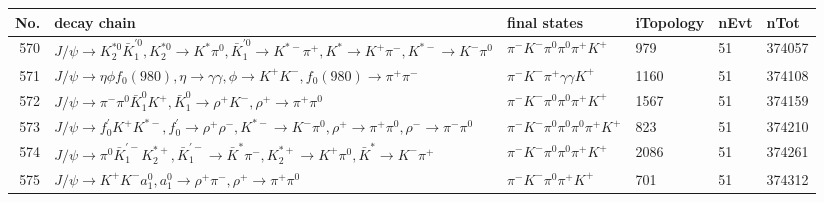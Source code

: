 \begin{table}[htbp] 
\begin{center}
\begin{small}
\begin{tabular}{rlllll}\hline\hline
 No. & decay chain & final states &  iTopology & nEvt & nTot \\\hline
570&$J/\psi       \rightarrow K_2^{*0}       \bar{K}_1^{'0}, K_2^{*0}        \rightarrow K^{*}          \pi^{0}        , \bar{K}_1^{'0} \rightarrow K^{*-}         \pi^{+}        , K^{*}           \rightarrow K^{+}          \pi^{-}        , K^{*-}          \rightarrow K^{-}          \pi^{0}        $&$\pi^{-}        K^{-}          \pi^{0}        \pi^{0}        \pi^{+}        K^{+}          $&  979&   51&374057\\
571&$J/\psi       \rightarrow \eta          \phi           f_{0}(980)     , \eta           \rightarrow \gamma       \gamma       , \phi            \rightarrow K^{+}          K^{-}          , f_{0}(980)      \rightarrow \pi^{+}        \pi^{-}        $&$\pi^{-}        K^{-}          \pi^{+}        \gamma       \gamma       K^{+}          $& 1160&   51&374108\\
572&$J/\psi       \rightarrow \pi^{-}        \pi^{0}        \bar{K}_1^{0} K^{+}          , \bar{K}_1^{0}  \rightarrow \rho^{+}      K^{-}          , \rho^{+}       \rightarrow \pi^{+}        \pi^{0}        $&$\pi^{-}        K^{-}          \pi^{0}        \pi^{0}        \pi^{+}        K^{+}          $& 1567&   51&374159\\
573&$J/\psi       \rightarrow f^{'}_{0}     K^{+}          K^{*-}         , f^{'}_{0}      \rightarrow \rho^{+}      \rho^{-}      , K^{*-}          \rightarrow K^{-}          \pi^{0}        , \rho^{+}       \rightarrow \pi^{+}        \pi^{0}        , \rho^{-}       \rightarrow \pi^{-}        \pi^{0}        $&$\pi^{-}        K^{-}          \pi^{0}        \pi^{0}        \pi^{0}        \pi^{+}        K^{+}          $&  823&   51&374210\\
574&$J/\psi       \rightarrow \pi^{0}        \bar{K}_1^{'-}K_2^{*+}       , \bar{K}_1^{'-} \rightarrow \bar{K}^{*}   \pi^{-}        , K_2^{*+}        \rightarrow K^{+}          \pi^{0}        , \bar{K}^{*}    \rightarrow K^{-}          \pi^{+}        $&$\pi^{-}        K^{-}          \pi^{0}        \pi^{0}        \pi^{+}        K^{+}          $& 2086&   51&374261\\
575&$J/\psi       \rightarrow K^{+}          K^{-}          a_{1}^{0}      , a_{1}^{0}       \rightarrow \rho^{+}      \pi^{-}        , \rho^{+}       \rightarrow \pi^{+}        \pi^{0}        $&$\pi^{-}        K^{-}          \pi^{0}        \pi^{+}        K^{+}          $&  701&   51&374312\\

\end{tabular}
\end{small}
\end{center}
\end{table}
